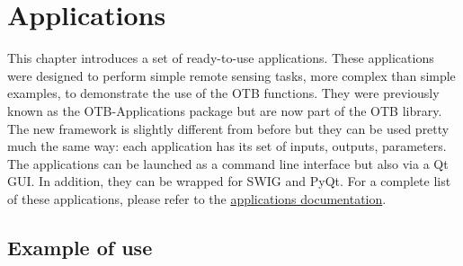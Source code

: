 \chapter{Applications}
\label{sec:Applications}

This chapter introduces a set of ready-to-use applications. 
These applications were designed to perform  simple remote sensing tasks, 
more complex than simple examples, to demonstrate the use of the OTB 
functions. They were previously known as the OTB-Applications 
package but are now part of the OTB library. The new framework is 
slightly different from before but they can be used pretty much the 
same way: each application has its set of inputs, outputs, parameters. 
The applications can be launched as a command line interface but also
via a Qt GUI. In addition, they can be wrapped for SWIG and PyQt. For a 
complete list of these applications, please refer to the 
\href{http://orfeo-toolbox.org/Applications}{applications documentation}.

\section{Example of use}
\label{sec:appExample}

